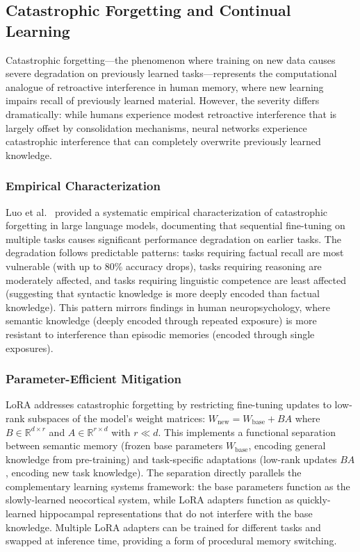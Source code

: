 \documentclass[11pt,letterpaper]{article}
\begin{document}
\subsection{Catastrophic Forgetting and Continual Learning}
\label{subsec:catastrophic}

Catastrophic forgetting---the phenomenon where training on new data causes severe degradation on previously learned tasks---represents the computational analogue of retroactive interference in human memory, where new learning impairs recall of previously learned material. However, the severity differs dramatically: while humans experience modest retroactive interference that is largely offset by consolidation mechanisms, neural networks experience catastrophic interference that can completely overwrite previously learned knowledge.

\subsubsection{Empirical Characterization}

Luo et al.\ \cite{luo2023empirical} provided a systematic empirical characterization of catastrophic forgetting in large language models, documenting that sequential fine-tuning on multiple tasks causes significant performance degradation on earlier tasks. The degradation follows predictable patterns: tasks requiring factual recall are most vulnerable (with up to 80\% accuracy drops), tasks requiring reasoning are moderately affected, and tasks requiring linguistic competence are least affected (suggesting that syntactic knowledge is more deeply encoded than factual knowledge). This pattern mirrors findings in human neuropsychology, where semantic knowledge (deeply encoded through repeated exposure) is more resistant to interference than episodic memories (encoded through single exposures).

\subsubsection{Parameter-Efficient Mitigation}

LoRA \cite{hu2022lora} addresses catastrophic forgetting by restricting fine-tuning updates to low-rank subspaces of the model's weight matrices: $W_{\text{new}} = W_{\text{base}} + BA$ where $B \in \mathbb{R}^{d \times r}$ and $A \in \mathbb{R}^{r \times d}$ with $r \ll d$. This implements a functional separation between semantic memory (frozen base parameters $W_{\text{base}}$, encoding general knowledge from pre-training) and task-specific adaptations (low-rank updates $BA$, encoding new task knowledge). The separation directly parallels the complementary learning systems framework: the base parameters function as the slowly-learned neocortical system, while LoRA adapters function as quickly-learned hippocampal representations that do not interfere with the base knowledge. Multiple LoRA adapters can be trained for different tasks and swapped at inference time, providing a form of procedural memory switching.
\end{document}
